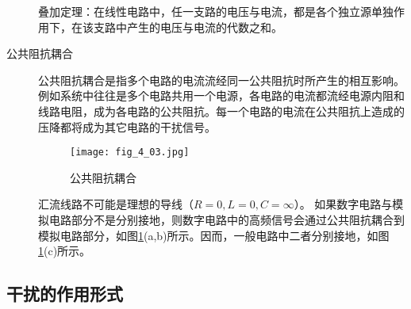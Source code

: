 \begin{description}
\begin{remark}
叠加定理：在线性电路中，任一支路的电压与电流，都是各个独立源单独作用下，在该支路中产生的电压与电流的代数之和。
\end{remark}

  \item[公共阻抗耦合]
  公共阻抗耦合是指多个电路的电流流经同一公共阻抗时所产生的相互影响。例如系统中往往是多个电路共用一个电源，各电路的电流都流经电源内阻和线路电阻，成为各电路的公共阻抗。每一个电路的电流在公共阻抗上造成的压降都将成为其它电路的干扰信号。

\begin{figure}[h]
  \centering
  \texttt{[image: fig\_4\_03.jpg]}\\
  \caption{公共阻抗耦合}\label{fig_4_03}
\end{figure}

\begin{remark}
汇流线路不可能是理想的导线（$R=0, L=0, C=\infty $）。
如果数字电路与模拟电路部分不是分别接地，则数字电路中的高频信号会通过公共阻抗耦合到模拟电路部分，如图\ref{fig_4_03}(a,b)所示。因而，一般电路中二者分别接地，如图\ref{fig_4_03}(c)所示。
\end{remark}

\end{description}





\subsection{干扰的作用形式 }

